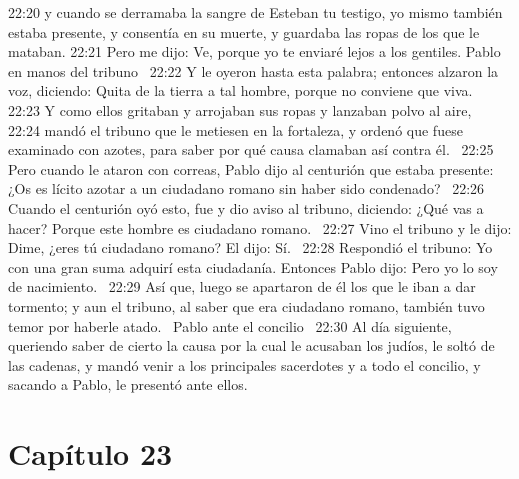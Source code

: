 22:20 y cuando se derramaba la sangre de Esteban tu testigo, yo mismo también estaba presente, y consentía en su muerte, y guardaba las ropas de los que le mataban. 
22:21 Pero me dijo: Ve, porque yo te enviaré lejos a los gentiles. 
Pablo en manos del tribuno  
22:22 Y le oyeron hasta esta palabra; entonces alzaron la voz, diciendo: Quita de la tierra a tal hombre, porque no conviene que viva.  
22:23 Y como ellos gritaban y arrojaban sus ropas y lanzaban polvo al aire,  
22:24 mandó el tribuno que le metiesen en la fortaleza, y ordenó que fuese examinado con azotes, para saber por qué causa clamaban así contra él.  
22:25 Pero cuando le ataron con correas, Pablo dijo al centurión que estaba presente: ¿Os es lícito azotar a un ciudadano romano sin haber sido condenado?  
22:26 Cuando el centurión oyó esto, fue y dio aviso al tribuno, diciendo: ¿Qué vas a hacer? Porque este hombre es ciudadano romano.  
22:27 Vino el tribuno y le dijo: Dime, ¿eres tú ciudadano romano? El dijo: Sí.  
22:28 Respondió el tribuno: Yo con una gran suma adquirí esta ciudadanía. Entonces Pablo dijo: Pero yo lo soy de nacimiento.  
22:29 Así que, luego se apartaron de él los que le iban a dar tormento; y aun el tribuno, al saber que era ciudadano romano, también tuvo temor por haberle atado.  
Pablo ante el concilio  
22:30 Al día siguiente, queriendo saber de cierto la causa por la cual le acusaban los judíos, le soltó de las cadenas, y mandó venir a los principales sacerdotes y a todo el concilio, y sacando a Pablo, le presentó ante ellos.  
\section*{Capítulo 23}

